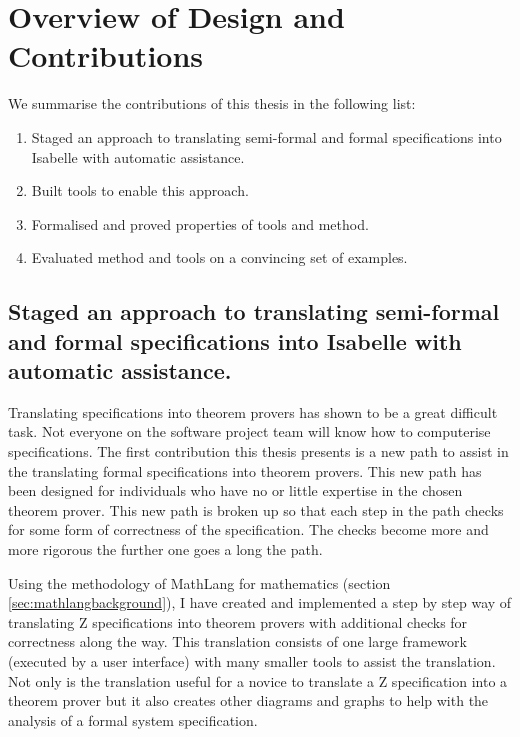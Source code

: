 \chapter{Overview of Design and Contributions}
\label{ch:contributions}

We summarise the contributions of this thesis in the following list:

\begin{enumerate}
\item Staged an approach to translating semi-formal and formal specifications into Isabelle with automatic assistance.
\item Built tools to enable this approach.
\item Formalised and proved properties of tools and method.
\item Evaluated method and tools on a convincing set of examples.
\end{enumerate}

\section{Staged an approach to translating semi-formal and formal specifications into Isabelle with automatic assistance.}

Translating specifications into theorem provers has shown to be a great difficult task. Not everyone on the software project team will know how to computerise specifications. The first contribution this thesis presents is a new path to assist in the translating formal specifications into theorem provers. This new path has been designed for individuals who have no or little expertise in the chosen theorem prover. This new path is broken up so that each step in the path checks for some form of correctness of the specification. The checks become more and more rigorous the further one goes a long the path.

Using the methodology of MathLang for mathematics (section \ref{sec:mathlangbackground}), I have created and implemented a step by step way of translating Z specifications into theorem provers with additional checks for correctness along the way. This translation consists of one large framework (executed by a user interface) with many smaller tools to assist the translation. Not only is the translation useful for a novice to translate a Z specification into a theorem prover but it also creates other diagrams and graphs to help with the analysis of a formal system specification.

